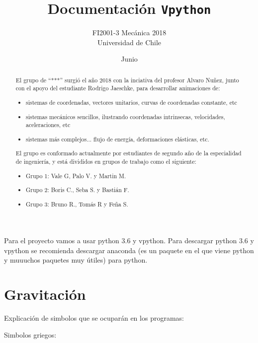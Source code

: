 \documentclass[letterpaper,12pt]{article}
\title{\Huge\bfseries Documentación \texttt{Vpython}}
\author{\Large FI2001-3 Mecánica 2018\\ Universidad de Chile}
\date{Junio}
\begin{document}
\pagestyle{empty}
\maketitle
\begin{abstract}
El grupo de ``***'' surgió el año 2018 con la inciativa del profesor Alvaro Nuñez, junto con el apoyo del estudiante Rodrigo Jaeschke, para desarrollar animaciones de:
\begin{itemize}
\item sistemas de coordenadas, vectores unitarios, curvas de coordenadas constante, etc
\item sistemas mecánicos sencillos, ilustrando coordenadas intrinsecas, velocidades, aceleraciones, etc
\item sistemas más complejos... flujo de energía, deformaciones elásticas, etc. 
\end{itemize}
El grupo es conformado actualmente por estudiantes de segundo año de la especialidad de ingeniería, y está divididos en grupos de trabajo como el siguiente:
\begin{itemize}
	\item Grupo 1: Vale G, Palo V. y Martin M.
	\item Grupo 2: Boris C., Seba S. y Bastián F.
	\item Grupo 3: Bruno R., Tomás R y Feña S.
\end{itemize}
\end{abstract}
\thispagestyle{empty} %

\newpage
\thispagestyle{empty}
\tableofcontents
\listoftables
\listoffigures
\printunsrtglossary[type=symbols,style=alttreegroup,title={Lista de simbolos}]
\newpage
Para el proyecto vamos a usar python 3.6 y vpython. Para descargar python 3.6 y vpython se recomienda descargar anaconda (es un paquete en el que viene python y muuuchos paquetes muy útiles) para python.

\section{Gravitación}
Explicación de simbolos que se ocuparán en los programas:

Simbolos griegos: 
 
\end{document}
